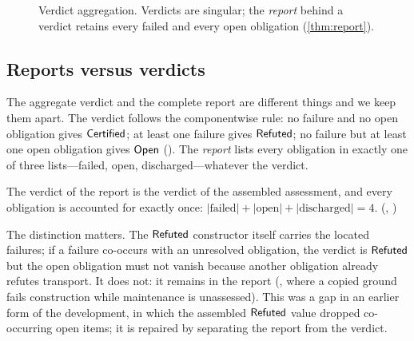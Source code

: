 \begin{figure}[t]
\centering
{}
\caption{Verdict aggregation. Verdicts are singular; the \emph{report} behind a verdict retains every failed and every open obligation (\cref{thm:report}).}
\label{fig:aggregation}
\end{figure}

\subsection{Reports versus verdicts}
The aggregate verdict and the complete report are different things and we keep them apart. The verdict follows the componentwise rule: no failure and no open obligation gives $\mathsf{Certified}$; at least one failure gives $\mathsf{Refuted}$; no failure but at least one open obligation gives $\mathsf{Open}$ (). The \emph{report} lists every obligation in exactly one of three lists---failed, open, discharged---whatever the verdict.
\begin{theorem}\label{thm:report}
The verdict of the report is the verdict of the assembled assessment, and every obligation is accounted for exactly once: $|\text{failed}| + |\text{open}| + |\text{discharged}| = 4$. (, )
\end{theorem}
The distinction matters. The $\mathsf{Refuted}$ constructor itself carries the located failures; if a failure co-occurs with an unresolved obligation, the verdict is $\mathsf{Refuted}$ but the open obligation must not vanish because another obligation already refutes transport. It does not: it remains in the report (, where a copied ground fails construction while maintenance is unassessed). This was a gap in an earlier form of the development, in which the assembled $\mathsf{Refuted}$ value dropped co-occurring open items; it is repaired by separating the report from the verdict.

